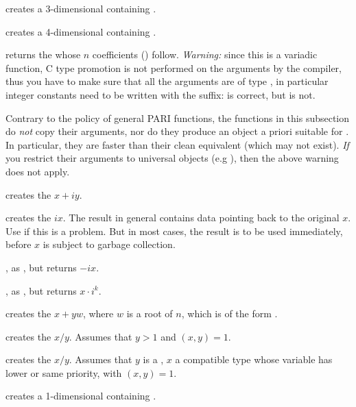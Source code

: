  creates a 3-dimensional
 containing \kbd{[x, y, z]}.

 creates a 4-dimensional
 containing \kbd{[x, y, z, t]}.

 returns the  whose $n$
coefficients () follow.
\emph{Warning:} since this is a variadic function, C type promotion is not
performed on the arguments by the compiler, thus you have to make sure that all
the arguments are of type , in particular integer constants need to
be written with the  suffix:  is correct,
but  is not.

\label{se:unclean}

Contrary to the policy of general PARI functions, the functions in this
subsection do \emph{not} copy their arguments, nor do they produce an object
a priori suitable for . In particular, they are
faster than their clean equivalent (which may not exist). \emph{If} you
restrict their arguments to universal objects (e.g ),
then the above warning does not apply.

 creates the  $x + iy$.

 creates the  $ix$. The result in
general contains data pointing back to the original $x$. Use  if
this is a problem. But in most cases, the result is to be used immediately,
before $x$ is subject to garbage collection.

, as , but returns $-ix$.

, as , but returns
$x \cdot i^k$.

 creates the  $x + yw$,
where $w$ is a root of $n$, which is of the form .

 creates the  $x/y$. Assumes that
$y > 1$ and $(x,y) = 1$.

 creates the  $x/y$. Assumes
that $y$ is a , $x$ a compatible type whose variable has lower
or same priority, with $(x,y) = 1$.

 creates a 1-dimensional  containing .

